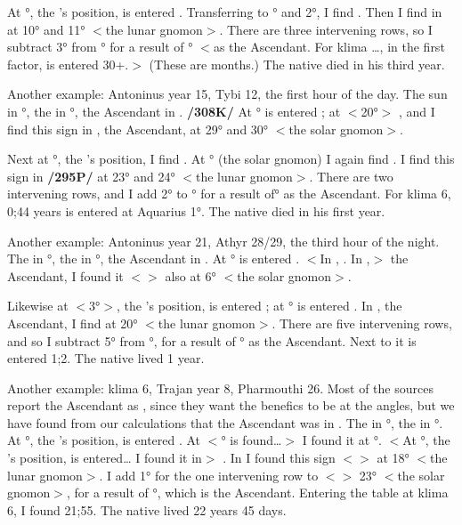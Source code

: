 At \Taurus\xspace 28°, the \Moon’s position, is entered \Aries. Transferring to \Aries\xspace 1° and 2°, I find \Leo. Then I find \Leo\xspace in \Capricorn\xspace at 10° and 11° $<$the lunar gnomon$>$. There are three intervening rows, so I subtract 3° from \Capricorn\xspace 1° for a result of \Sagittarius\xspace 28° $<$as the Ascendant. For klima …, in the first factor, is entered 30+.$>$ (These are months.) The native died in his third year.

Another example: Antoninus year 15, Tybi 12, the first hour of the day. The sun in \Capricorn\xspace 20°, the \Moon\xspace in \Gemini\xspace 28°, the Ascendant in \Capricorn. \textbf{/308K/} At \Capricorn\xspace 20° is entered \Libra; at \Libra\xspace $<$20°$>$ \Pisces, and I find this sign in \Capricorn, the Ascendant, at 29° and 30° $<$the solar gnomon$>$. 

Next at \Gemini\xspace 28°, the \Moon’s position, I find \Aquarius. At \Aquarius\xspace 29° (the solar gnomon) I again find \Aquarius. I find this sign in \Capricorn\xspace \textbf{/295P/} at 23° and 24° $<$the lunar gnomon$>$. There are two intervening rows, and I add 2° to \Capricorn\xspace 28° for a result of\Aquarius\xspace 1° as the Ascendant. For klima 6, 0;44 years is entered at Aquarius 1°. The native died in his first year.

Another example: Antoninus year 21, Athyr 28/29, the third hour of the night. The \Sun\xspace in \Sagittarius\xspace 6°, the \Moon\xspace in \Aquarius\xspace 3°, the Ascendant in \Cancer. At \Sagittarius\xspace 6° is entered \Cancer. $<$In \Cancer, \Aries. In \Cancer,$>$ the Ascendant, I found it $<$\Aries$>$ also at 6° $<$the solar gnomon$>$.

Likewise at \Aquarius\xspace $<$3°$>$, the \Moon’s position, is entered \Cancer; at \Cancer\xspace 3° is entered \Virgo. In \Cancer, the Ascendant, I find \Virgo\xspace at 20° $<$the lunar gnomon$>$. There are five intervening rows, and so I subtract 5° from \Cancer\xspace 6°, for a result of \Cancer\xspace 1° as the Ascendant. Next to it is entered 1;2. The native lived 1 year.

Another example: klima 6, Trajan year 8, Pharmouthi 26. Most of the sources report the Ascendant as \Cancer, since they want the benefics to be at the angles, but we have found from our calculations that the Ascendant was in \Gemini. The \Sun\xspace in \Taurus\xspace 3°, the \Moon\xspace in \Sagittarius\xspace 21°. At \Taurus\xspace 3°, the \Sun’s position, is entered \Aquarius. At $<$\Aquarius\xspace 3° is found…$>$ I found it at \Gemini\xspace 23°. $<$At \Sagittarius\xspace 21°, the \Moon’s position, is entered… I found it in$>$ \Scorpio. In \Gemini\xspace I found this sign $<$\Scorpio$>$ at 18° $<$the lunar gnomon$>$. I add 1° for the one intervening row to $<$\Gemini$>$ 23° $<$the solar gnomon$>$, for a result of \Gemini\xspace 24°, which is the Ascendant. Entering the table at klima 6, I found 21;55. The native lived 22 years 45 days.


